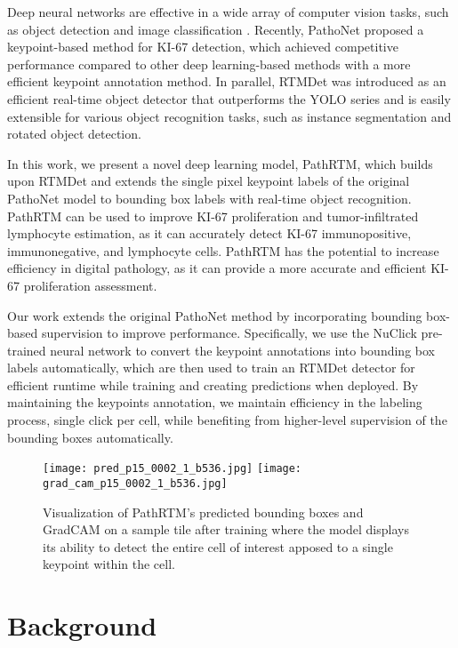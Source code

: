 \documentclass[runningheads]{llncs}
\begin{document}
Deep neural networks are effective in a wide array of computer vision tasks, such as object detection and image classification \cite{voulodimos2018deep}. Recently, PathoNet \cite{negahbani2021pathonet} proposed a keypoint-based method for KI-67 detection, which achieved competitive performance compared to other deep learning-based methods with a more efficient keypoint annotation method. In parallel, RTMDet \cite{lyu2022rtmdet} was introduced as an efficient real-time object detector that outperforms the YOLO series \cite{DBLP:journals/corr/RedmonDGF15} and is easily extensible for various object recognition tasks, such as instance segmentation and rotated object detection.

In this work, we present a novel deep learning model, PathRTM, which builds upon RTMDet and extends the single pixel keypoint labels of the original PathoNet model to bounding box labels with real-time object recognition. PathRTM can be used to improve KI-67 proliferation and tumor-infiltrated lymphocyte estimation, as it can accurately detect KI-67 immunopositive, immunonegative, and lymphocyte cells. PathRTM has the potential to increase efficiency in digital pathology, as it can provide a more accurate and efficient KI-67 proliferation assessment.

Our work extends the original PathoNet method by incorporating bounding box-based supervision to improve performance. Specifically, we use the NuClick \cite{DBLP:journals/corr/abs-2005-14511} pre-trained neural network to convert the keypoint annotations into bounding box labels automatically, which are then used to train an RTMDet detector for efficient runtime while training and creating predictions when deployed. By maintaining the keypoints annotation, we maintain efficiency in the labeling process, single click per cell, while benefiting from higher-level supervision of the bounding boxes automatically.

\begin{figure}
	\centering
	\texttt{[image: pred\_p15\_0002\_1\_b536.jpg]}
	\hfill
	\texttt{[image: grad\_cam\_p15\_0002\_1\_b536.jpg]}
	\caption{Visualization of PathRTM's predicted bounding boxes and GradCAM \cite{selvaraju1610grad} on a sample tile after training where the model displays its ability to detect the entire cell of interest apposed to a single keypoint within the cell.}
    \label{fig:gradcam}
\end{figure}

\section{Background}
\end{document}
